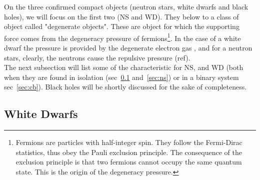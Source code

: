 On the three confirmed compact objects (neutron stars, white dwarfs and black holes), we will focus on the first two (NS and WD). They below to a class of object called "degenerate objects". These are object for which the supporting force comes from the degeneracy pressure of fermions\footnote{Fermions are particles with half-integer spin. They follow the Fermi-Dirac statistics, thus obey the Pauli exclusion principle. The consequence of the exclusion principle is that two fermions cannot occupy the same quantum state. This is the origin of the degeneracy pressure. }. In the case of a white dwarf the pressure is provided by the degenerate electron gas \citep{fowler_dense_1926}, and for a neutron stars, clearly, the neutrons cause the repulsive pressure (ref). \\

The next subsection will list some of the characteristic for NS, and WD (both when they are found in isolation (sec~\ref{sec:wd} and~\ref{sec:ns}) or in a binary system sec~\ref{sec:cb}). Black holes will be shortly discussed for the sake of completeness. 



\subsection[White Dwarfs]{White Dwarfs}\label{sec:wd} 

